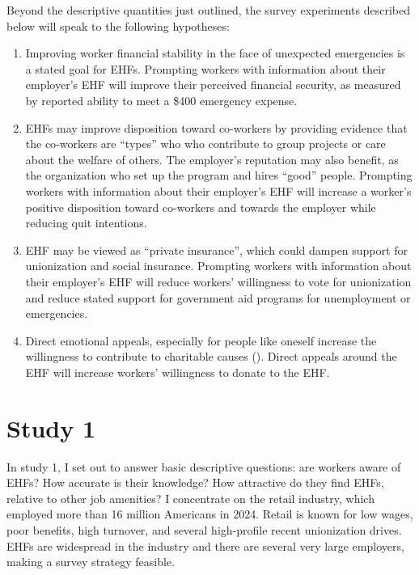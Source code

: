 \documentclass[
  11pt,
  oneside]{article}
\providecommand{\tightlist}{%
  \setlength{\itemsep}{0pt}\setlength{\parskip}{0pt}}
\begin{document}
Beyond the descriptive quantities just outlined, the survey experiments described below will speak to the following hypotheses:

\begin{enumerate}
\def\labelenumi{\arabic{enumi}.}
\tightlist
\item
  Improving worker financial stability in the face of unexpected emergencies is a stated goal for EHFs. Prompting workers with information about their employer's EHF will improve their perceived financial security, as measured by reported ability to meet a \$400 emergency expense.
\item
  EHFs may improve disposition toward co-workers by providing evidence that the co-workers are ``types'' who who contribute to group projects or care about the welfare of others. The employer's reputation may also benefit, as the organization who set up the program and hires ``good'' people. Prompting workers with information about their employer's EHF will increase a worker's positive disposition toward co-workers and towards the employer while reducing quit intentions.
\item
  EHF may be viewed as ``private insurance'', which could dampen support for unionization and social insurance. Prompting workers with information about their employer's EHF will reduce workers' willingness to vote for unionization and reduce stated support for government aid programs for unemployment or emergencies.
\item
  Direct emotional appeals, especially for people like oneself increase the willingness to contribute to charitable causes (). Direct appeals around the EHF will increase workers' willingness to donate to the EHF.
\end{enumerate}

\section{Study 1}\label{study-1}

In study 1, I set out to answer basic descriptive questions: are workers aware of EHFs? How accurate is their knowledge? How attractive do they find EHFs, relative to other job amenities? I concentrate on the retail industry, which employed more than 16 million Americans in 2024. Retail is known for low wages, poor benefits, high turnover, and several high-profile recent unionization drives. EHFs are widespread in the industry and there are several very large employers, making a survey strategy feasible.
\end{document}
